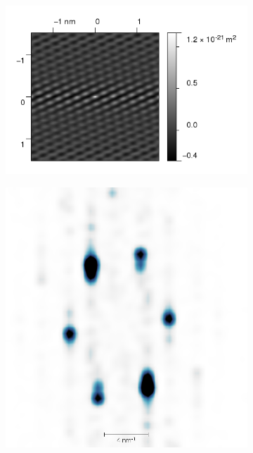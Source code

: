 \begin{figure}
    \begin{subfigure}[b]{\picwidth}
        \includegraphics[width=\textwidth]{pics/fourier4}
    \end{subfigure}\qquad
    \begin{subfigure}[b]{\picwidth}
        \includegraphics[width=\textwidth]{pics/fourier5}
    \end{subfigure}

\end{figure}
